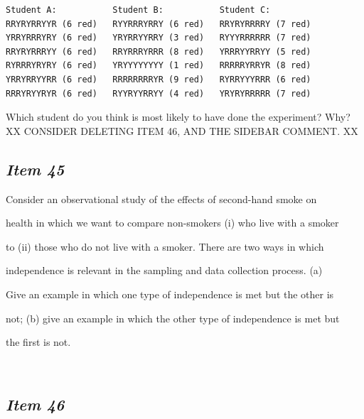 

\begin{verbatim}
Student A:           Student B:           Student C:
RRYRYRRYYR (6 red)   RYYRRRYRRY (6 red)   RRYRYRRRRY (7 red)
YRRYRRRYRY (6 red)   YRYRRYYRRY (3 red)   RYYYRRRRRR (7 red)
RRYRYRRRYY (6 red)   RRYRRRYRRR (8 red)   YRRRYYRRYY (5 red)
RYRRRYRYRY (6 red)   YRYYYYYYYY (1 red)   RRRRRYRRYR (8 red)
YRRYRRYYRR (6 red)   RRRRRRRRYR (9 red)   RYRRYYYRRR (6 red)
RRRYRYYRYR (6 red)   RYYRYYRRYY (4 red)   YRYRYRRRRR (7 red)
\end{verbatim}


Which student do you think is most likely to have done the experiment? Why? 
XX CONSIDER DELETING ITEM 46, AND THE SIDEBAR COMMENT. XX





\subsection{\textbf{\textit{Item 45}}}





Consider an observational study of the effects of second-hand smoke on


health in which we want to compare non-smokers (i) who live with a smoker


to (ii) those who do not live with a smoker. There are two ways in which


independence is relevant in the sampling and data collection process. (a)


Give an example in which one type of independence is met but the other is


not; (b) give an example in which the other type of independence is met but


the first is not.





\ 





\subsection{\textbf{\textit{Item 46}}}





